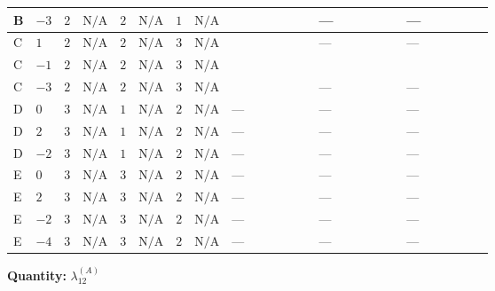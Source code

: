 \documentclass[8pt]{article}
\begin{document}
\begin{landscape}
\begin{longtable}{@{}llcccccc >{\raggedright\arraybackslash}p{0.21\linewidth} >{\raggedright\arraybackslash}p{0.21\linewidth} >{\raggedright\arraybackslash}p{0.21\linewidth}@{}}
\midrule
B & $-3$ & $2$ & $\text{N/A}$ & $2$ & $\text{N/A}$ & $1$ & $\text{N/A}$ & \scriptsize\adjustbox{max width=\linewidth}{$\begin{gathered} +{\lambda_{HS_1}^{(A)}} {\lambda_{HS_2}^{(A)}}\end{gathered}$} & --- & --- \\
\midrule
C & $1$ & $2$ & $\text{N/A}$ & $2$ & $\text{N/A}$ & $3$ & $\text{N/A}$ & \scriptsize\adjustbox{max width=\linewidth}{$\begin{gathered} +{\lambda_{HS_1}^{(A)}} {\lambda_{HS_2}^{(A)}}\end{gathered}$} & --- & --- \\
\midrule
C & $-1$ & $2$ & $\text{N/A}$ & $2$ & $\text{N/A}$ & $3$ & $\text{N/A}$ & \scriptsize\adjustbox{max width=\linewidth}{$\begin{gathered} +{\lambda_{HS_1}^{(A)}} {\lambda_{HS_2}^{(A)}}\end{gathered}$} & \scriptsize\adjustbox{max width=\linewidth}{$\begin{gathered} 4 {\lambda_{X_{17}}^{(1)}} \left({\lambda_{H H^\dagger S_1^\dagger S_2^\dagger}^{\rm Cross}}\right)^{*}\end{gathered}$} & \scriptsize\adjustbox{max width=\linewidth}{$\begin{gathered} +4 {\lambda_{H H^\dagger S_1^\dagger S_2^\dagger}^{\rm Cross}} \left({\lambda_{X_{17}}^{(1)}}\right)^{*}\end{gathered}$} \\
\midrule
C & $-3$ & $2$ & $\text{N/A}$ & $2$ & $\text{N/A}$ & $3$ & $\text{N/A}$ & \scriptsize\adjustbox{max width=\linewidth}{$\begin{gathered} +{\lambda_{HS_1}^{(A)}} {\lambda_{HS_2}^{(A)}}\end{gathered}$} & --- & --- \\
\midrule
D & $0$ & $3$ & $\text{N/A}$ & $1$ & $\text{N/A}$ & $2$ & $\text{N/A}$ & --- & --- & --- \\
\midrule
D & $2$ & $3$ & $\text{N/A}$ & $1$ & $\text{N/A}$ & $2$ & $\text{N/A}$ & --- & --- & --- \\
\midrule
D & $-2$ & $3$ & $\text{N/A}$ & $1$ & $\text{N/A}$ & $2$ & $\text{N/A}$ & --- & --- & --- \\
\midrule
E & $0$ & $3$ & $\text{N/A}$ & $3$ & $\text{N/A}$ & $2$ & $\text{N/A}$ & --- & --- & --- \\
\midrule
E & $2$ & $3$ & $\text{N/A}$ & $3$ & $\text{N/A}$ & $2$ & $\text{N/A}$ & --- & --- & --- \\
\midrule
E & $-2$ & $3$ & $\text{N/A}$ & $3$ & $\text{N/A}$ & $2$ & $\text{N/A}$ & --- & --- & --- \\
\midrule
E & $-4$ & $3$ & $\text{N/A}$ & $3$ & $\text{N/A}$ & $2$ & $\text{N/A}$ & --- & --- & --- \\
\midrule
\bottomrule
\end{longtable}
\clearpage
\noindent\textbf{Quantity: }$\lambda_{12}^{(A)}$\par\smallskip

\end{landscape}
\end{document}
